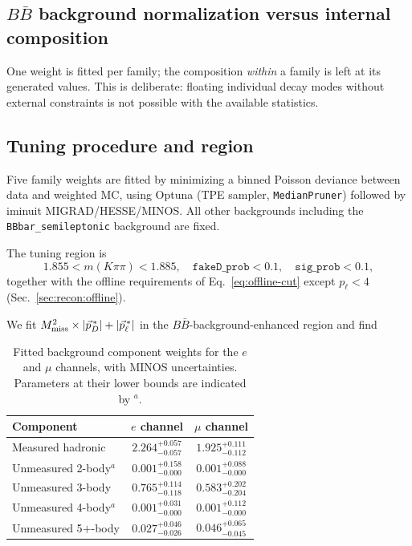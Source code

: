 \subsection{$B\bar{B}$ background normalization versus internal composition}
\label{sec:bbbar:normalization}
One weight is fitted per family; the composition \emph{within} a family is
left at its generated values.
This is deliberate: floating individual decay modes without external
constraints is not possible with the available statistics.


\subsection{Tuning procedure and region}
\label{sec:bbbar:tuning}
Five family weights are fitted by minimizing a binned Poisson deviance
between data and weighted MC, using Optuna (TPE sampler, \texttt{MedianPruner})
followed by iminuit MIGRAD/HESSE/MINOS. All other backgrounds including the 
\texttt{BBbar\_semileptonic} background are fixed. 


The tuning region is
\begin{equation}
  1.855 < m(K\pi\pi) < 1.885,\quad
  \texttt{fakeD\_prob} < 0.1,\quad
  \texttt{sig\_prob} < 0.1 ,
  \label{eq:bbbar-region}
\end{equation}
together with the offline requirements of Eq.~\eqref{eq:offline-cut} except
$p_{\ell} < 4$ (Sec.~\ref{sec:recon:offline}).


We fit $M_{\mathrm{miss}}^{2} \times |\vec{p}^{\,*}_{D}| + |\vec{p}^{\,*}_{\ell}|$ in the $B\bar{B}$-background-enhanced region and
find 
\vspace{2mm}

\begin{table}[h]
\centering
\caption{Fitted background component weights for the $e$ and $\mu$ channels,
with MINOS uncertainties. Parameters at their lower bounds are indicated by $^a$.}
\vspace{2mm}
\label{tab:bg_weights}
\begin{tabular}{lcc}
\hline\hline
Component & $e$ channel & $\mu$ channel \\
\hline
Measured hadronic        & $2.264^{+0.057}_{-0.057}$ & $1.925^{+0.111}_{-0.112}$ \\
Unmeasured 2-body$^{a}$  & $0.001^{+0.158}_{-0.000}$ & $0.001^{+0.088}_{-0.000}$ \\
Unmeasured 3-body        & $0.765^{+0.114}_{-0.118}$ & $0.583^{+0.202}_{-0.204}$ \\
Unmeasured 4-body$^{a}$  & $0.001^{+0.031}_{-0.000}$ & $0.001^{+0.112}_{-0.000}$ \\
Unmeasured 5$+$-body     & $0.027^{+0.046}_{-0.026}$ & $0.046^{+0.065}_{-0.045}$ \\

\hline\hline
\end{tabular}
\end{table}

